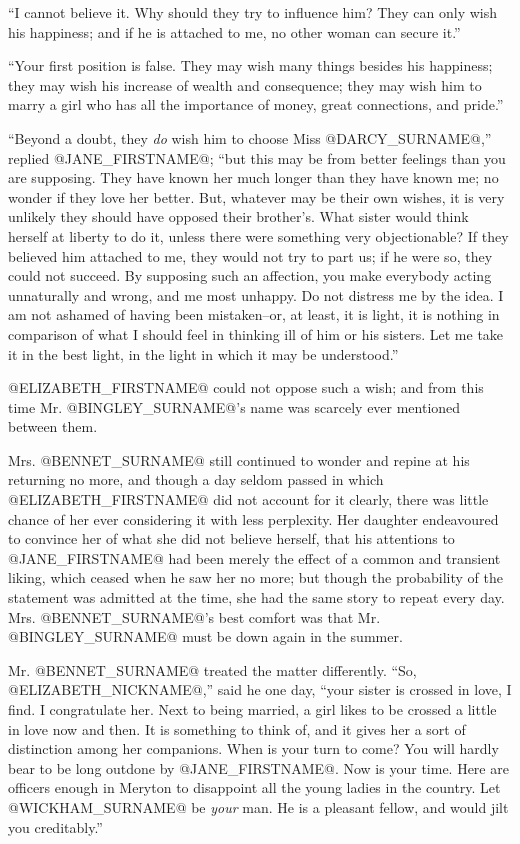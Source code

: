 ``I cannot believe it. Why should they try to influence him? They can
only wish his happiness; and if he is attached to me, no other woman can
secure it.''

``Your first position is false. They may wish many things besides his
happiness; they may wish his increase of wealth and consequence; they
may wish him to marry a girl who has all the importance of money, great
connections, and pride.''

``Beyond a doubt, they \textit{do} wish him to choose Miss @DARCY_SURNAME@,'' replied @JANE_FIRSTNAME@;
``but this may be from better feelings than you are supposing. They have
known her much longer than they have known me; no wonder if they love
her better. But, whatever may be their own wishes, it is very unlikely
they should have opposed their brother's. What sister would think
herself at liberty to do it, unless there were something very
objectionable? If they believed him attached to me, they would not try
to part us; if he were so, they could not succeed. By supposing such an
affection, you make everybody acting unnaturally and wrong, and me most
unhappy. Do not distress me by the idea. I am not ashamed of having been
mistaken--or, at least, it is light, it is nothing in comparison of what
I should feel in thinking ill of him or his sisters. Let me take it in
the best light, in the light in which it may be understood.''

@ELIZABETH_FIRSTNAME@ could not oppose such a wish; and from this time Mr. @BINGLEY_SURNAME@'s
name was scarcely ever mentioned between them.

Mrs. @BENNET_SURNAME@ still continued to wonder and repine at his returning no
more, and though a day seldom passed in which @ELIZABETH_FIRSTNAME@ did not account
for it clearly, there was little chance of her ever considering it with
less perplexity. Her daughter endeavoured to convince her of what she
did not believe herself, that his attentions to @JANE_FIRSTNAME@ had been merely the
effect of a common and transient liking, which ceased when he saw her
no more; but though the probability of the statement was admitted at
the time, she had the same story to repeat every day. Mrs. @BENNET_SURNAME@'s best
comfort was that Mr. @BINGLEY_SURNAME@ must be down again in the summer.

Mr. @BENNET_SURNAME@ treated the matter differently. ``So, @ELIZABETH_NICKNAME@,'' said he one day,
``your sister is crossed in love, I find. I congratulate her. Next to
being married, a girl likes to be crossed a little in love now and then.
It is something to think of, and it gives her a sort of distinction
among her companions. When is your turn to come? You will hardly bear to
be long outdone by @JANE_FIRSTNAME@. Now is your time. Here are officers enough in
Meryton to disappoint all the young ladies in the country. Let @WICKHAM_SURNAME@
be \textit{your} man. He is a pleasant fellow, and would jilt you creditably.''

